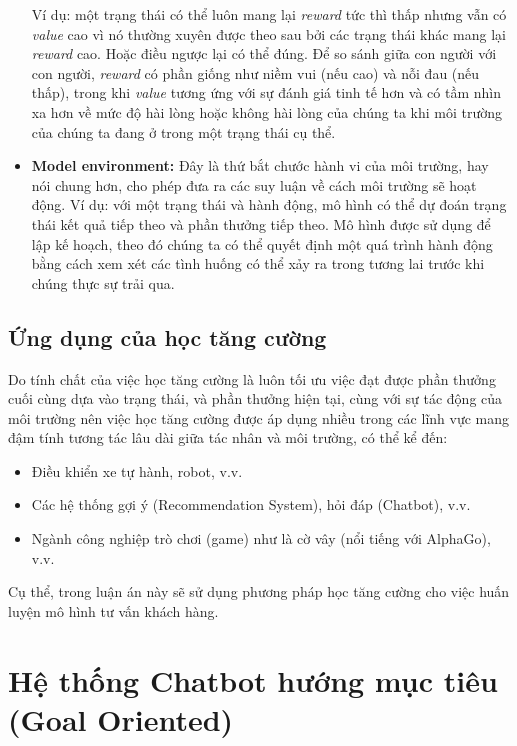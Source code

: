 \begin{itemize}
    Ví dụ: một trạng thái có thể luôn mang lại \textit{reward} tức thì
    thấp nhưng vẫn có \textit{value} cao vì nó thường xuyên được
    theo sau bởi các trạng thái khác mang lại \textit{reward} cao.
    Hoặc điều ngược lại có thể đúng. Để so sánh giữa con người với
    con người, \textit{reward} có phần giống như niềm vui (nếu cao)
    và nỗi đau (nếu thấp), trong khi \textit{value} tương ứng với sự
    đánh giá tinh tế hơn và có tầm nhìn xa hơn về mức độ hài lòng
    hoặc không hài lòng của chúng ta khi môi trường của chúng ta
    đang ở trong một trạng thái cụ thể.
    \item \textbf{Model environment:} Đây là thứ bắt chước hành vi
    của môi trường, hay nói chung hơn, cho phép đưa ra các suy luận
    về cách môi trường sẽ hoạt động. Ví dụ: với một trạng thái và
    hành động, mô hình có thể dự đoán trạng thái kết quả tiếp theo
    và phần thưởng tiếp theo. Mô hình được sử dụng để lập kế hoạch,
    theo đó chúng ta có thể quyết định một quá trình hành động
    bằng cách xem xét các tình huống có thể xảy ra trong tương lai
    trước khi chúng thực sự trải qua.
\end{itemize}

\subsection{Ứng dụng của học tăng cường}
Do tính chất của việc học tăng cường là luôn tối ưu việc đạt được
phần thưởng cuối cùng dựa vào trạng thái, và phần thưởng hiện tại,
cùng với sự tác động của môi trường nên việc học tăng cường được
áp dụng nhiều trong các lĩnh vực mang đậm tính tương tác lâu dài
giữa tác nhân và môi trường, có thể kể đến:

\begin{itemize}
    \item Điều khiển xe tự hành, robot, v.v.
    \item Các hệ thống gợi ý (Recommendation System), hỏi đáp
    (Chatbot), v.v.
    \item Ngành công nghiệp trò chơi (game) như là cờ vây
    (nổi tiếng với AlphaGo), v.v.
\end{itemize}

Cụ thể, trong luận án này sẽ sử dụng phương pháp học tăng cường
cho việc huấn luyện mô hình tư vấn khách hàng.

\section{Hệ thống Chatbot hướng mục tiêu (Goal Oriented)}

